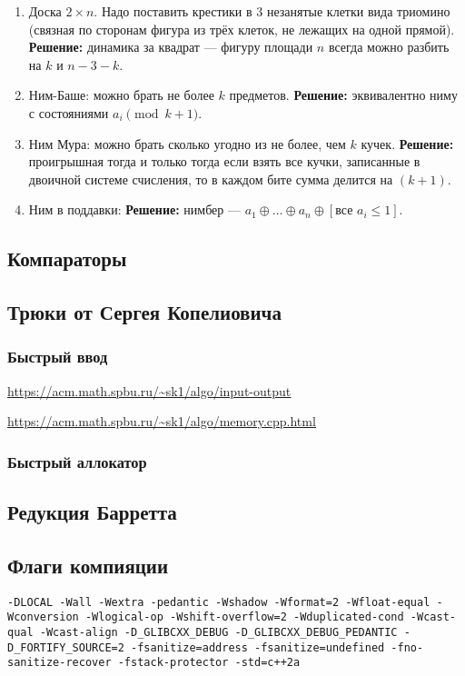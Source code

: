 \begin{enumerate}
\item Доска $2 \times n$. Надо поставить крестики в $3$ незанятые клетки вида триомино (связная по сторонам фигура из трёх клеток, не лежащих на одной прямой). \textbf{Решение:} динамика за квадрат --- фигуру площади $n$ всегда можно разбить на $k$ и $n-3-k$.
\item Ним-Баше: можно брать не более $k$ предметов. \textbf{Решение: } эквивалентно ниму с состояниями $a_i \pmod{k+1}$.
\item Ним Мура: можно брать сколько угодно из не более, чем $k$ кучек. \textbf{Решение:} проигрышная тогда и только тогда если взять все кучки, записанные в двоичной системе счисления, то в каждом бите сумма делится на $(k+1)$.
\item Ним в поддавки: \textbf{Решение:} нимбер --- $a_1 \oplus \ldots \oplus a_n \oplus [\text{все }a_i \le 1]$.
\end{enumerate}
\subsection{Компараторы}

\subsection{Трюки от Сергея Копелиовича}
\subsubsection{Быстрый ввод}
\underline{\url{https://acm.math.spbu.ru/~sk1/algo/input-output}}


\underline{\url{https://acm.math.spbu.ru/~sk1/algo/memory.cpp.html}}
\subsubsection{Быстрый аллокатор}

\subsection{Редукция Барретта}

\subsection{Флаги компияции}
\texttt{-DLOCAL -Wall -Wextra -pedantic -Wshadow -Wformat=2 -Wfloat-equal -Wconversion -Wlogical-op -Wshift-overflow=2 -Wduplicated-cond -Wcast-qual -Wcast-align -D\_GLIBCXX\_DEBUG -D\_GLIBCXX\_DEBUG\_PEDANTIC -D\_FORTIFY\_SOURCE=2 -fsanitize=address -fsanitize=undefined -fno-sanitize-recover -fstack-protector -std=c++2a}
